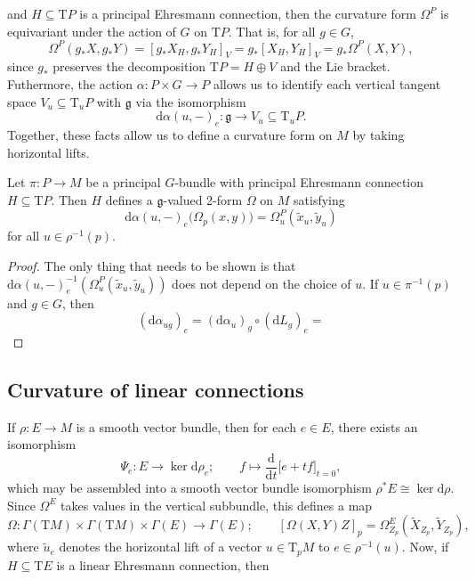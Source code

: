 and $H \subseteq \mathrm{T}P$ is a principal Ehresmann connection, then the curvature form $\Omega^P$ is equivariant under the action of $G$ on $\mathrm{T}P$. That is, for all $g \in G$,
\begin{equation}
  \Omega^P(g_* X, g_* Y) = [g_* X_H, g_* Y_H]_V = g_*[X_H, Y_H]_V = g_*\Omega^P(X, Y),
\end{equation}
since $g_*$ preserves the decomposition $\mathrm{T}P = H \oplus V$ and the Lie bracket. Futhermore, the action $\alpha \colon P \times G \to P$ allows us to identify each vertical tangent space $V_u \subseteq \mathrm{T}_u P$ with $\mathfrak{g}$ via the isomorphism
\begin{equation}
  \mathrm{d}\alpha(u, -)_e \colon \mathfrak{g} \to V_u \subseteq \mathrm{T}_u P. 
\end{equation}
Together, these facts allow us to define a curvature form on $M$ by taking horizontal lifts.
\begin{proposition}
Let $\pi \colon P \to M$ be a principal $G$-bundle with principal Ehresmann connection $H \subseteq \mathrm{T}P$. Then $H$ defines a $\mathfrak{g}$-valued 2-form $\Omega$ on $M$ satisfying
\begin{equation}
  \mathrm{d}\alpha(u, -)_{e} \Big(\Omega_p(x, y)\Big) = \Omega_{u}^P(\widetilde{x}_u, \widetilde{y}_u)
\end{equation}
for all $u \in \rho^{-1}(p)$.
\end{proposition}
\begin{proof}
  The only thing that needs to be shown is that $\mathrm{d}\alpha(u, -)_{e}^{-1} (\Omega_{u}^P(\widetilde{x}_u, \widetilde{y}_u))$ does not depend on the choice of $u$. If $u\in \pi^{-1}(p)$ and $g \in G$, then
  \begin{equation}
    (\mathrm{d}\alpha_{ug})_e =  (\mathrm{d}\alpha_u)_g \circ (\mathrm{d}L_g)_e = 
  \end{equation}
\end{proof}


\subsection{Curvature of linear connections}
If $\rho \colon E \to M$ is a smooth vector bundle, then for each $e \in E$, there exists an isomorphism
\begin{equation}
  \Psi_e \colon E \to \ker \mathrm{d}\rho_{e}; \quad \quad f \longmapsto  \frac{\mathrm{d}}{\mathrm{d}t} \Big[e + tf\Big]_{t=0},
\end{equation}
which may be assembled into a smooth vector bundle isomorphism $\rho^* E \cong \ker \mathrm{d}\rho$. Since $\Omega^E$ takes values in the vertical subbundle, this defines a map
\begin{equation}
  \Omega \colon \Gamma(\mathrm{T}M) \times \Gamma(\mathrm{T}M) \times \Gamma(E) \to \Gamma(E); \quad \quad [\Omega(X, Y)Z]_p = \Omega^{E}_{Z_p}\!\left(\widetilde{X}_{Z_p}, \widetilde{Y}_{Z_p}\right),
\end{equation}
where $\widetilde{u}_e$ denotes the horizontal lift of a vector $u \in \mathrm{T}_p M$ to $e \in \rho^{-1}(u)$. Now, if $H \subseteq \mathrm{T}E$ is a linear Ehresmann connection, then




